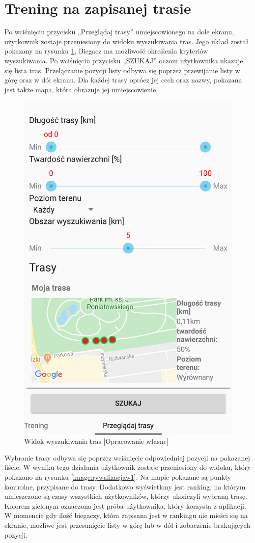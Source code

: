 \section{Trening na zapisanej trasie}
Po wciśnięciu przycisku  „Przeglądaj trasy” umiejscowionego na dole ekranu, użytkownik zostaje przeniesiony do widoku wyszukiwania tras. Jego układ został pokazany na rysunku \ref{image:wyszukiwanie}. Biegacz ma możliwość określenia kryteriów wyszukiwania. Po wciśnięciu przycisku „SZUKAJ” oczom użytkownika ukazuje się lista tras. Przełączanie pozycji listy odbywa się poprzez przewijanie listy w górę oraz w dół ekranu. Dla każdej trasy oprócz jej cech oraz nazwy, pokazana jest także mapa, która obrazuje jej umiejscowienie.
\begin{figure}[h]\label{fig:xamarin_model}
\begin{center}
\includegraphics[width=.5\linewidth,frame]{img/wyszukiwanie.png}
\caption{Widok wyszukiwania tras [Opracowanie własne]}\label{image:wyszukiwanie}
\end{center}
\end{figure}

Wybranie trasy odbywa się poprzez wciśnięcie odpowiedniej pozycji na pokazanej liście. W wyniku tego działania użytkownik zostaje przeniesiony do widoku, który pokazano na rysunku \ref{image:rywalizacjaw1}. Na mapie pokazane są punkty kontrolne, przypisane do trasy. Dodatkowo wyświetlony jest ranking, na którym umieszczone są czasy wszystkich użytkowników, którzy ukończyli wybraną trasę. Kolorem zielonym oznaczona jest próba użytkownika, który korzysta z aplikacji. W momencie gdy ilość biegaczy, która zapisana jest w rankingu nie mieści się na ekranie, możliwe jest przesunięcie listy w górę lub w dół i zobaczenie brakujących pozycji.

